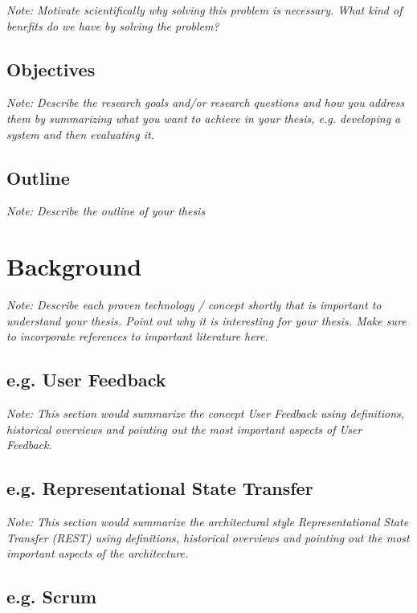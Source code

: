 \documentclass[a4paper,12pt,twoside]{report}
\begin{document}
\textit{Note: Motivate scientifically why solving this problem is necessary. What kind of benefits do we have by solving the problem?}

\section{Objectives}

\textit{Note: Describe the research goals and/or research questions and how you address them by summarizing what you want to achieve in your thesis, e.g. developing a system and then evaluating it.}

\section{Outline}

\textit{Note: Describe the outline of your thesis}





\chapter{Background}

\textit{Note: Describe each proven technology / concept shortly that is important to understand your thesis. Point out why it is interesting for your thesis. Make sure to incorporate references to important literature here.}

\section{e.g. User Feedback}

\textit{Note: This section would summarize the concept User Feedback using definitions, historical overviews and pointing out the most important aspects of User Feedback.}

\section{e.g. Representational State Transfer}

\textit{Note: This section would summarize the architectural style Representational State Transfer (REST) using definitions, historical overviews and pointing out the most important aspects of the architecture.}

\section{e.g. Scrum}
\end{document}

